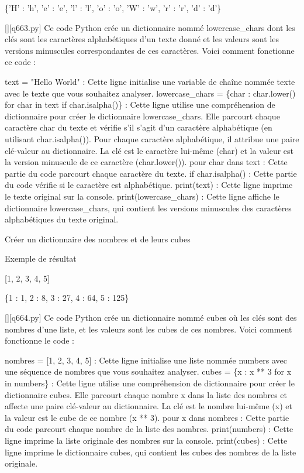 \{'H' : 'h', 'e' : 'e', 'l' : 'l', 'o' : 'o', 'W' : 'w', 'r' : 'r', 'd' : 'd'\}
        \par
        \begin{solution}
            \renewcommand{\nomfichier}{q663.py}
            \pythonfile{\chemincode \nomfichier}[][\nomfichier]
            Ce code Python crée un dictionnaire nommé lowercase\_chars dont les clés sont les caractères alphabétiques d'un texte donné et les valeurs sont les versions minuscules correspondantes de ces caractères. Voici comment fonctionne ce code :

    text = "Hello World" : Cette ligne initialise une variable de chaîne nommée texte avec le texte que vous souhaitez analyser.
    lowercase\_chars = \{char : char.lower() for char in text if char.isalpha()\} : Cette ligne utilise une compréhension de dictionnaire pour créer le dictionnaire lowercase\_chars. Elle parcourt chaque caractère char du texte et vérifie s'il s'agit d'un caractère alphabétique (en utilisant char.isalpha()). Pour chaque caractère alphabétique, il attribue une paire clé-valeur au dictionnaire. La clé est le caractère lui-même (char) et la valeur est la version minuscule de ce caractère (char.lower()).
        pour char dans text : Cette partie du code parcourt chaque caractère du texte.
        if char.isalpha() : Cette partie du code vérifie si le caractère est alphabétique.
    print(text) : Cette ligne imprime le texte original sur la console.
    print(lowercase\_chars) : Cette ligne affiche le dictionnaire lowercase\_chars, qui contient les versions minuscules des caractères alphabétiques du texte original.
        \end{solution}
        

        \question
        Créer un dictionnaire des nombres et de leurs cubes

Exemple de résultat

[1, 2, 3, 4, 5]

\{1 : 1, 2 : 8, 3 : 27, 4 : 64, 5 : 125\}
        \par
        \begin{solution}
            \renewcommand{\nomfichier}{q664.py}
            \pythonfile{\chemincode \nomfichier}[][\nomfichier]
            Ce code Python crée un dictionnaire nommé cubes où les clés sont des nombres d'une liste, et les valeurs sont les cubes de ces nombres. Voici comment fonctionne le code :

    nombres = [1, 2, 3, 4, 5] : Cette ligne initialise une liste nommée numbers avec une séquence de nombres que vous souhaitez analyser.
    cubes = \{x : x ** 3 for x in numbers\} : Cette ligne utilise une compréhension de dictionnaire pour créer le dictionnaire cubes. Elle parcourt chaque nombre x dans la liste des nombres et affecte une paire clé-valeur au dictionnaire. La clé est le nombre lui-même (x) et la valeur est le cube de ce nombre (x ** 3).
        pour x dans nombres : Cette partie du code parcourt chaque nombre de la liste des nombres.
    print(numbers) : Cette ligne imprime la liste originale des nombres sur la console.
    print(cubes) : Cette ligne imprime le dictionnaire cubes, qui contient les cubes des nombres de la liste originale.
        \end{solution}
        

